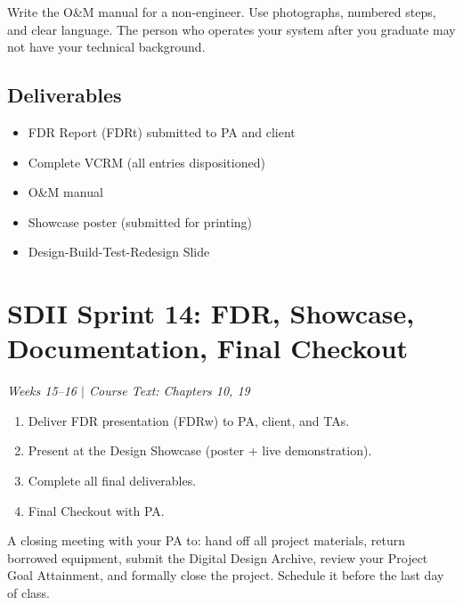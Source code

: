 \documentclass[11pt,letterpaper]{article}
\begin{document}
\begin{protip}
Write the O\&M manual for a non-engineer. Use photographs, numbered steps, and clear language. The person who operates your system after you graduate may not have your technical background.
\end{protip}

\subsection{Deliverables}
\begin{itemize}[nosep,leftmargin=1.5em]
\item FDR Report (FDRt) submitted to PA and client
\item Complete VCRM (all entries dispositioned)
\item O\&M manual
\item Showcase poster (submitted for printing)
\item Design-Build-Test-Redesign Slide
\end{itemize}


\section{SDII Sprint 14: FDR, Showcase, Documentation, Final Checkout}
\textit{Weeks 15--16 $|$ Course Text: Chapters 10, 19}

\begin{priorities}
\begin{enumerate}[nosep]
\item Deliver FDR presentation (FDRw) to PA, client, and TAs.
\item Present at the Design Showcase (poster + live demonstration).
\item Complete all final deliverables.
\item Final Checkout with PA.
\end{enumerate}
\end{priorities}

\begin{faqbox}
A closing meeting with your PA to: hand off all project materials, return borrowed equipment, submit the Digital Design Archive, review your Project Goal Attainment, and formally close the project. Schedule it before the last day of class.
\end{faqbox}
\end{document}
